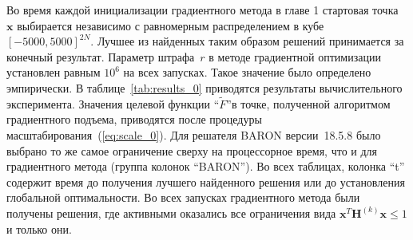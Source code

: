 Во время каждой инициализации градиентного метода в главе 1 стартовая точка~$\textbf{x}$ выбирается независимо с равномерным распределением в кубе $[-5000, 5000]^{2N}$. Лучшее из найденных таким образом решений принимается за конечный результат. Параметр штрафа~$r$ в методе градиентной оптимизации установлен равным $10^6$ на всех запусках. Такое значение было определено эмпирически. В таблице~\ref{tab:results_0} приводятся результаты вычислительного эксперимента. Значения целевой функции ``$\tilde{F}$''в точке, полученной алгоритмом градиентного подъема, приводятся после процедуры масштабирования~(\ref{eq:scale_0}). Для решателя BARON версии~18.5.8 было выбрано то же самое ограничение сверху на процессорное время, что и для градиентного метода (группа колонок ``BARON''). Во всех таблицах, колонка ``t'' содержит время до получения лучшего найденного решения или до установления глобальной оптимальности. Во всех запусках градиентного метода были получены решения, где активными оказались все ограничения вида $\textbf{x}^{T}\textbf{H}^{(k)}\textbf{x} \leq 1$ и только они.


